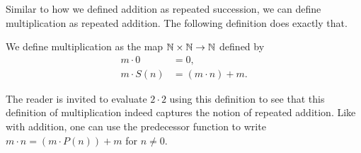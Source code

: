 \documentclass[../main.tex]{subfiles}
\begin{document}
Similar to how we defined addition as repeated succession, we can define multiplication as repeated addition. The following definition does exactly that.
\begin{definition}\label{dfn:the_natural_numbers_integers_and_rational_numbers:N_multiplication}
    We define multiplication as the map $\mathbb{N}\times\mathbb{N}\to\mathbb{N}$ defined by
    \begin{align*}
        m\cdot0 & =0, \\
        m\cdot S(n) & =(m\cdot n)+m.
    \end{align*}
\end{definition}
The reader is invited to evaluate $2\cdot2$ using this definition to see that this definition of multiplication indeed captures the notion of repeated addition. Like with addition, one can use the predecessor function to write $m\cdot n=(m\cdot P(n))+m$ for $n\neq0$.
\end{document}
